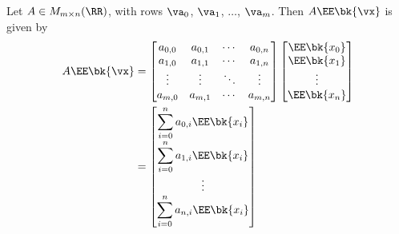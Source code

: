 \documentclass[189]{pset}
\begin{document}
\begin{enumerate}
        Let $A \in M_{m\times n}(\RR)$, with rows $\va_0$, $\va_1$,
        $\ldots$, $\va_m$. Then $A\EE\bk{\vx}$ is given by
        \begin{align*}
          A\EE\bk{\vx}
          &=
            \begin{bmatrix}
              a_{0,0} & a_{0,1} & \cdots & a_{0,n} \\
              a_{1,0} & a_{1,1} & \cdots & a_{1,n} \\
              \vdots & \vdots & \ddots & \vdots \\
              a_{m,0} & a_{m,1} & \cdots & a_{m,n}
            \end{bmatrix}
            \begin{bmatrix}
              \EE\bk{x_0} \\
              \EE\bk{x_1} \\
              \vdots \\
              \EE\bk{x_n}
            \end{bmatrix} \\
          &=
            \begin{bmatrix}
              \displaystyle\sum_{i=0}^n a_{0,i}\EE\bk{x_i} \\[1em]
              \displaystyle\sum_{i=0}^n a_{1,i}\EE\bk{x_i} \\[1em]
              \vdots\\
              \displaystyle\sum_{i=0}^n a_{n,i}\EE\bk{x_i}
            \end{bmatrix}
        \end{align*}

\end{enumerate}
\end{document}
